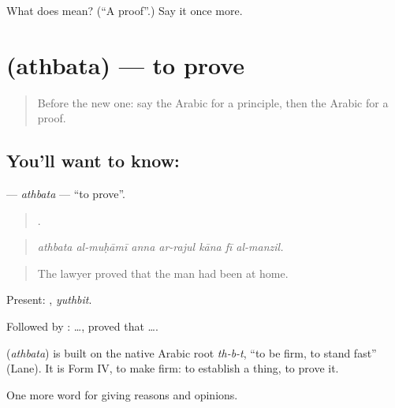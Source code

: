 \begin{tcolorbox}[breakable,colback=teal!4,colframe=teal!35!black,title={Before you move on}]
What does  mean? (\textquotedblleft{}A proof\textquotedblright{}.) Say it once more.
\end{tcolorbox}
\section[\texorpdfstring{\ar{أثبت} (athbata)}{أثبت (athbata)}]{ (athbata) — to prove}

\label{lesson:AR-C358-athbata}



\begin{quote}
Before the new one: say the Arabic for a principle, then the Arabic for a proof.
\end{quote}

\subsection*{You'll want to know: }
\textbf{} — \emph{athbata} — \textquotedblleft{}to prove\textquotedblright{}.

\begin{quote}
      .
\end{quote}

\begin{quote}
\emph{athbata al-muḥāmī anna ar-rajul kāna fī al-manzil.}
\end{quote}

\begin{quote}
The lawyer proved that the man had been at home.
\end{quote}

Present: , \emph{yuthbit}.

Followed by :   …, proved that ….

\begin{cousinweb}
\textbf{} (\emph{athbata}) is built on the native Arabic root \emph{th-b-t}, \textquotedblleft{}to be firm, to stand fast\textquotedblright{} (Lane). It is Form IV, to make firm: to establish a thing, to prove it.
\end{cousinweb}

\begin{grammarlens}[title={What you've built}]
One more word for giving reasons and opinions.
\end{grammarlens}

